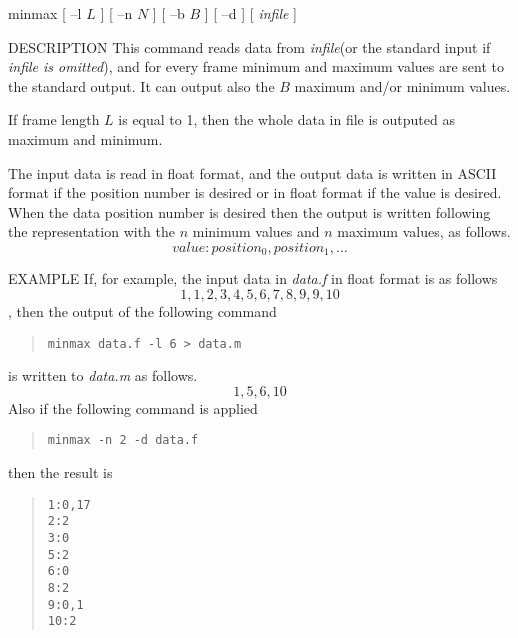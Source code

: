 
\begin{synopsis}
 \item [minmax] [ --l $L$ ] [ --n $N$ ] [ --b $B$ ] [ --d ] [ {\em infile} ]
\end{synopsis}

\begin{qsection}{DESCRIPTION}
This command reads data from {\em infile}(or the standard input if
{\em infile is omitted}), and for every frame minimum and maximum
values are sent to the standard output.
It can output also the $B$ maximum and/or minimum values.

If frame length $L$ is equal to 1, then the whole data in file
is outputed as maximum and minimum.

The input data is read in float format,
and the output data is written in ASCII format
if the position number is desired or in float format
if the value is desired.
When the data position number is desired then
the output is written following the representation 
with the $n$ minimum values and
$n$ maximum values, as follows.
\begin{displaymath}
value:position_0,position_1,\ldots
\end{displaymath}
\end{qsection}

\begin{options}
\end{options}

\begin{qsection}{EXAMPLE}
If, for example, the input data in {\em data.f} in float format
is as follows
\[1,1,2,3,4,5,6,7,8,9,9,10\],
then the output of the following command
\begin{quote}
 \verb!minmax data.f -l 6 > data.m!
\end{quote}
is written to {\em data.m} as follows.
\[1,5,6,10\]
Also if the following command is applied
\begin{quote}
 \verb!minmax -n 2 -d data.f!
\end{quote}
then the result is 
\begin{quote}
 \verb!1:0,17!\\
 \verb!2:2!\\
 \verb!3:0!\\
 \verb!5:2!\\
 \verb!6:0!\\
 \verb!8:2!\\
 \verb!9:0,1!\\
 \verb!10:2!
\end{quote}
\end{qsection}

